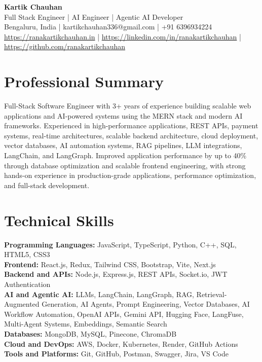 \documentclass[10pt,a4paper]{article}
\begin{document}
\begin{center}
{\LARGE \textbf{Kartik Chauhan}}\\
Full Stack Engineer | AI Engineer | Agentic AI Developer\\
Bengaluru, India | kartikchauhan336@gmail.com | +91 6396934224\\
\href{https://ranakartikchauhan.in}{https://ranakartikchauhan.in} |
\href{https://linkedin.com/in/ranakartikchauhan}{https://linkedin.com/in/ranakartikchauhan} |
\href{https://github.com/ranakartikchauhan}{https://github.com/ranakartikchauhan}
\end{center}

\section*{Professional Summary}
Full-Stack Software Engineer with 3+ years of experience building scalable web applications and AI-powered systems using the MERN stack and modern AI frameworks. Experienced in high-performance applications, REST APIs, payment systems, real-time architectures, scalable backend architecture, cloud deployment, vector databases, AI automation systems, RAG pipelines, LLM integrations, LangChain, and LangGraph. Improved application performance by up to 40\% through database optimization and scalable frontend engineering, with strong hands-on experience in production-grade applications, performance optimization, and full-stack development.

\section*{Technical Skills}
\textbf{Programming Languages:} JavaScript, TypeScript, Python, C++, SQL, HTML5, CSS3\\
\textbf{Frontend:} React.js, Redux, Tailwind CSS, Bootstrap, Vite, Next.js\\
\textbf{Backend and APIs:} Node.js, Express.js, REST APIs, Socket.io, JWT Authentication\\
\textbf{AI and Agentic AI:} LLMs, LangChain, LangGraph, RAG, Retrieval-Augmented Generation, AI Agents, Prompt Engineering, Vector Databases, AI Workflow Automation, OpenAI APIs, Gemini API, Hugging Face, LangFuse, Multi-Agent Systems, Embeddings, Semantic Search\\
\textbf{Databases:} MongoDB, MySQL, Pinecone, ChromaDB\\
\textbf{Cloud and DevOps:} AWS, Docker, Kubernetes, Render, GitHub Actions\\
\textbf{Tools and Platforms:} Git, GitHub, Postman, Swagger, Jira, VS Code
\end{document}
